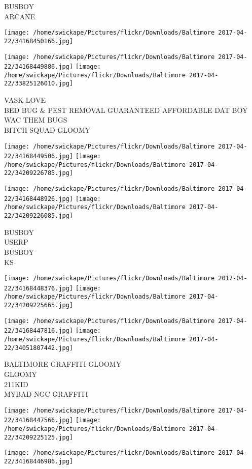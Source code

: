 \documentclass[10pt,letterpaper]{article}
\begin{document}
BUSBOY\\
ARCANE
\pagebreak

\texttt{[image: /home/swickape/Pictures/flickr/Downloads/Baltimore 2017-04-22/34168450166.jpg]}

\vspace{0.25in}
\texttt{[image: /home/swickape/Pictures/flickr/Downloads/Baltimore 2017-04-22/34168449886.jpg]}
\texttt{[image: /home/swickape/Pictures/flickr/Downloads/Baltimore 2017-04-22/33825126010.jpg]}

VASK LOVE\\
BED BUG \& PEST REMOVAL GUARANTEED AFFORDABLE DAT BOY WAC THEM BUGS\\
BITCH SQUAD GLOOMY
\pagebreak

\texttt{[image: /home/swickape/Pictures/flickr/Downloads/Baltimore 2017-04-22/34168449506.jpg]}
\texttt{[image: /home/swickape/Pictures/flickr/Downloads/Baltimore 2017-04-22/34209226785.jpg]}

\texttt{[image: /home/swickape/Pictures/flickr/Downloads/Baltimore 2017-04-22/34168448926.jpg]}
\texttt{[image: /home/swickape/Pictures/flickr/Downloads/Baltimore 2017-04-22/34209226085.jpg]}

BUSBOY\\
USERP\\
BUSBOY\\
KS
\pagebreak

\texttt{[image: /home/swickape/Pictures/flickr/Downloads/Baltimore 2017-04-22/34168448376.jpg]}
\texttt{[image: /home/swickape/Pictures/flickr/Downloads/Baltimore 2017-04-22/34209225665.jpg]}

\texttt{[image: /home/swickape/Pictures/flickr/Downloads/Baltimore 2017-04-22/34168447816.jpg]}
\texttt{[image: /home/swickape/Pictures/flickr/Downloads/Baltimore 2017-04-22/34051807442.jpg]}

BALTIMORE GRAFFITI GLOOMY\\
GLOOMY\\
211KID\\
MYBAD NGC GRAFFITI
\pagebreak

\texttt{[image: /home/swickape/Pictures/flickr/Downloads/Baltimore 2017-04-22/34168447566.jpg]}
\texttt{[image: /home/swickape/Pictures/flickr/Downloads/Baltimore 2017-04-22/34209225125.jpg]}

\vspace{0.25in}
\texttt{[image: /home/swickape/Pictures/flickr/Downloads/Baltimore 2017-04-22/34168446986.jpg]}
\end{document}
